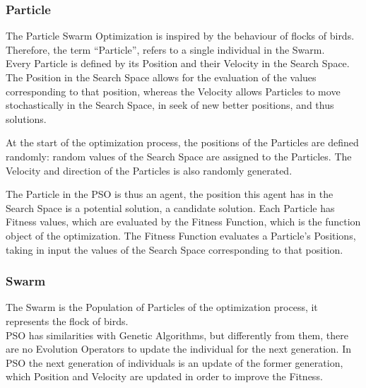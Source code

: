 \subsubsection{Particle}

The Particle Swarm Optimization is inspired by the behaviour of flocks of birds. Therefore, the term “Particle”, refers to a single individual in the Swarm.
\\[0.3cm]Every Particle is defined by its Position and their Velocity in the Search Space.
The Position in the Search Space allows for the evaluation of the values corresponding to that position, whereas the Velocity allows Particles to move stochastically in the Search Space, in seek of new better positions, and thus solutions.

At the start of the optimization process, the positions of the Particles are defined randomly: random values of the Search Space are assigned to the Particles.
The Velocity and direction of the Particles is also randomly generated.

The Particle in the PSO is thus an agent, the position this agent has in the Search Space is a potential solution, a candidate solution.
Each Particle has Fitness values, which are evaluated by the Fitness Function, which is the function object of the optimization.
The Fitness Function evaluates a Particle's Positions, taking in input the values of the Search Space corresponding to that position.

\subsubsection{Swarm}
The Swarm is the Population of Particles of the optimization process, it represents the flock of birds.
\\[0.3cm]PSO has similarities with Genetic Algorithms, but differently from them, there are no Evolution Operators to update the individual for the next generation.
In PSO the next generation of individuals is an update of the former generation, which Position and Velocity are updated in order to improve the Fitness.


